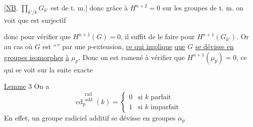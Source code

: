 [\uline{NB}. $\prod_{k'/k}G_{k'}$ est de t. m.] donc grâce à
$H^{n+2}=0$ sur les groupes de t. m. on voit que
est surjectif

donc pour vérifier que $H^{n+1}(G)=0$, il suffit
de le faire pour $H^{n+1}(G_{k'})$. Or
  au cas où $G$ est ``''
par une $p$-extension, \uline{ce qui implique}
\uline{que} $G$ \uline{se dévisse en groupes isomorphes}
\uline{à} $\mu_p$. Donc on est ramené à vérifier
que $H^{n+1}(\mu_p)=0$, ce qui se voit sur
la suite exacte

\uline{Lemme} 3  On a
\[
\mathrm{cd}^{\substack{\text{rad}\\\text{add}}}_p(k)=
\begin{cases}0&\text{si }k\text{ parfait}\\1&\text{si }k\text{ imparfait}\end{cases}
\]
En effet, un groupe radiciel additif se dévisse en
groupes $\alpha_p$ \unsure{\ldots}

